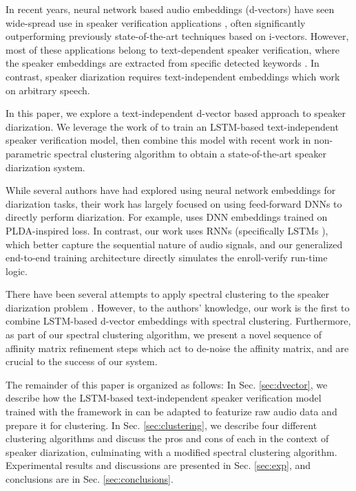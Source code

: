 \documentclass{article}
\begin{document}
In recent years, neural network based audio embeddings (d-vectors) have seen  wide-spread use in speaker verification
applications \cite{variani2014deep,chen2015locally,heigold2016end,attention,ge2e},
often significantly outperforming previously state-of-the-art techniques based on i-vectors.
However, most of these applications belong to text-dependent speaker verification,
where the speaker
embeddings are extracted from specific detected keywords \cite{chen2014small,prabhavalkar2015automatic}. In contrast, speaker diarization requires text-independent embeddings which work on arbitrary speech.

In this paper, we explore a text-independent d-vector based approach to speaker diarization. We leverage the work of \cite{ge2e} to train an LSTM-based text-independent speaker verification model, then combine this model with recent work in non-parametric spectral clustering algorithm to obtain a state-of-the-art speaker diarization system.

While several authors have had explored using neural network embeddings for diarization tasks, their work has largely focused on using feed-forward DNNs to directly perform diarization. For example, \cite{garcia2017speaker} uses DNN embeddings trained on PLDA-inspired loss.
In contrast, our work uses RNNs (specifically LSTMs \cite{hochreiter1997long}),
which better capture the sequential nature of
audio signals, and our generalized end-to-end training architecture directly simulates the enroll-verify run-time logic.

There have been several attempts to apply spectral clustering \cite{von2007tutorial}
to the speaker diarization problem \cite{ning2006spectral,shum2013unsupervised}. However, to the authors' knowledge, our work is the first to combine LSTM-based d-vector embeddings with spectral clustering. Furthermore, as part of our spectral clustering algorithm, we present a novel sequence of affinity matrix refinement steps which act to de-noise the affinity matrix, and are crucial to the success of our system.

The remainder of this paper is organized as follows: In Sec. \ref{sec:dvector}, we describe how the LSTM-based text-independent speaker verification model trained with the framework in \cite{ge2e} can be adapted to featurize raw audio data and prepare it for clustering. In Sec. \ref{sec:clustering}, we describe four different clustering algorithms and discuss the pros and cons of each in the context of speaker diarization, culminating with a modified spectral clustering algorithm. Experimental results and discussions are
presented in Sec. \ref{sec:exp}, and conclusions are in Sec. \ref{sec:conclusions}.
\end{document}
